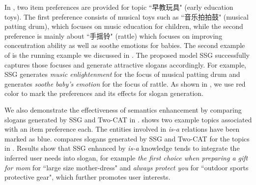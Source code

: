In , %
two item preferences are provided for topic ``早教玩具" (early education toys).
The first preference consists of musical toys such as ``音乐拍拍鼓" (musical patting drum),
which focuses on music education for children,
while the second preference is mainly about ``手摇铃" (rattle) which focuses on improving concentration ability 
as well as soothe emotions for babies.
The second example of 
 is the running example we discussed in .
The proposed model SSG successfully captures those focuses 
and generate attractive slogans accordingly.
For example, SSG generates \emph{music enlightenment}
for the focus of musical patting drum
and generates \emph{soothe baby's emotion } for the focus of 
rattle.
As shown in , 
we use red color to mark the preferences and its effects for slogan generation.

We also demonstrate the effectiveness of semantics enhancement
by comparing slogans generated by SSG and Two-CAT in .
 shows two example topics associated with an item preference each.
The entities involved in \emph{is-a} relations
have been marked as blue. 
 compares slogans generated by SSG and Two-CAT
for the topics in .
Results show that SSG enhanced by \emph{is-a} knowledge 
tends to integrate the inferred user needs into slogan,
for example \emph{the first choice when preparing a gift for mom} for ``large size mother-dress"
and \emph{always protect you} for ``outdoor sports protective gear",
which further promotes user interests.



%

%
%


